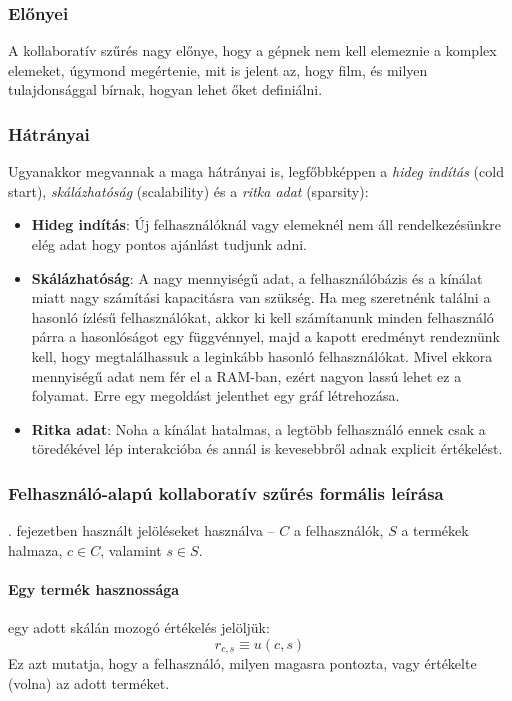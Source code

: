 \documentclass[
]{thesis-ekf}
\theoremstyle{definition}
\theoremstyle{remark}
\begin{document}
\subsubsection{Előnyei}
A kollaboratív szűrés nagy előnye, hogy a gépnek nem kell elemeznie a komplex elemeket, úgymond megértenie, mit is jelent az, hogy film, és milyen tulajdonsággal bírnak, hogyan lehet őket definiálni.\cite{wiki-recommender-system, wiki-collaborative-filtering}

\subsubsection{Hátrányai}
\label{p:kollaborativ-hatranyok}
Ugyanakkor megvannak a maga hátrányai is, legfőbbképpen a \emph{hideg indítás} (cold start), \emph{skálázhatóság} (scalability) és a \emph{ritka adat} (sparsity):
\begin{itemize}
	\item \label{hideg-inditas} \textbf{Hideg indítás}: Új felhasználóknál vagy elemeknél nem áll rendelkezésünkre elég adat hogy pontos ajánlást tudjunk adni.
	\item \textbf{Skálázhatóság}: A nagy mennyiségű adat, a felhasználóbázis és a kínálat miatt nagy számítási kapacitásra van szükség. Ha meg szeretnénk találni a hasonló ízlésű felhasználókat, akkor ki kell számítanunk minden felhasználó párra a hasonlóságot egy függvénnyel, majd a kapott eredményt rendeznünk kell, hogy megtalálhassuk a leginkább hasonló felhasználókat. Mivel ekkora mennyiségű adat nem fér el a RAM-ban, ezért nagyon lassú lehet ez a folyamat. Erre egy megoldást jelenthet egy gráf létrehozása.
	\item \textbf{Ritka adat}: Noha a kínálat hatalmas, a legtöbb felhasználó ennek csak a töredékével lép interakcióba és annál is kevesebbről adnak explicit értékelést.
\end{itemize}\cite{wiki-recommender-system, werner-ajanlo-rendszer, wiki-collaborative-filtering}

\subsubsection{Felhasználó-alapú kollaboratív szűrés formális leírása}
. fejezetben használt jelöléseket használva -- $C$ a felhasználók, $S$ a termékek halmaza, $c \in C$, valamint $s \in S$.
\paragraph{Egy termék hasznossága} egy adott skálán mozogó értékelés jelöljük:
\[r_{c,s}\equiv u(c,s)\]
Ez azt mutatja, hogy a felhasználó, milyen magasra pontozta, vagy értékelte (volna) az adott terméket.\cite{werner-ajanlo-rendszer}
\end{document}
